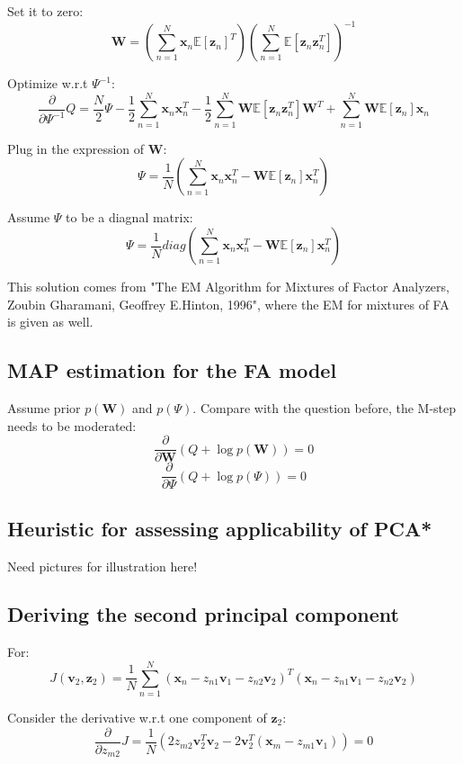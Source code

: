 \documentclass[UTF8]{ctexart}
\begin{document}
Set it to zero:
$$\textbf{W}=(\sum_{n=1}^{N}\textbf{x}_{n}\mathbb{E}[\textbf{z}_{n}]^{T})(\sum_{n=1}^{N}\mathbb{E}[\textbf{z}_{n}\textbf{z}_{n}^{T}])^{-1}$$

Optimize w.r.t $\Psi^{-1}$:
$$\frac{\partial}{\partial \Psi^{-1}}Q=\frac{N}{2}\Psi -\frac{1}{2}\sum_{n=1}^{N}\textbf{x}_{n}\textbf{x}_{n}^{T}-\frac{1}{2}\sum_{n=1}^{N}\textbf{W}\mathbb{E}[\textbf{z}_{n}\textbf{z}_{n}^{T}]\textbf{W}^{T}+\sum_{n=1}^{N}\textbf{W}\mathbb{E}[\textbf{z}_{n}]\textbf{x}_{n}$$

Plug in the expression of $\textbf{W}$:
$$\Psi=\frac{1}{N}(\sum_{n=1}^{N}\textbf{x}_{n}\textbf{x}_{n}^{T}-\textbf{W}\mathbb{E}[\textbf{z}_{n}]\textbf{x}_{n}^{T})$$

Assume $\Psi$ to be a diagnal matrix:
$$\Psi=\frac{1}{N}diag(\sum_{n=1}^{N}\textbf{x}_{n}\textbf{x}_{n}^{T}-\textbf{W}\mathbb{E}[\textbf{z}_{n}]\textbf{x}_{n}^{T})$$

This solution comes from "The EM Algorithm for Mixtures of Factor Analyzers, Zoubin Gharamani, Geoffrey E.Hinton, 1996", where the EM for mixtures of FA is given as well.

\subsection{MAP estimation for the FA model}
Assume prior $p(\textbf{W})$ and $p(\Psi)$. Compare with the question before, the M-step needs to be moderated:
$$\frac{\partial}{\partial \textbf{W}}(Q+\log p(\textbf{W}))=0$$
$$\frac{\partial}{\partial \Psi}(Q+\log p(\Psi))=0$$

\subsection{Heuristic for assessing applicability of PCA*}
Need pictures for illustration here!

\subsection{Deriving the second principal component}
For:
$$J(\textbf{v}_{2},\textbf{z}_{2})=\frac{1}{N}\sum_{n=1}^{N}(\textbf{x}_{n}-z_{n1}\textbf{v}_{1}-z_{n2}\textbf{v}_{2})^{T}(\textbf{x}_{n}-z_{n1}\textbf{v}_{1}-z_{n2}\textbf{v}_{2})$$

Consider the derivative w.r.t one component of $\textbf{z}_{2}$:
$$\frac{\partial}{\partial z_{m2}}J = \frac{1}{N}(2z_{m2}\textbf{v}_{2}^{T}\textbf{v}_{2}-2\textbf{v}_{2}^{T}(\textbf{x}_{m}-z_{m1}\textbf{v}_{1}))=0$$
\end{document}
